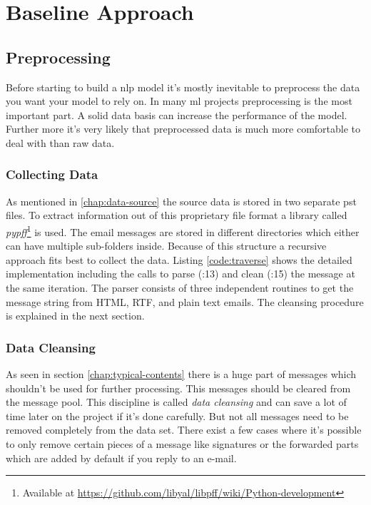 \chapter{Baseline Approach}

\section{Preprocessing}

Before starting to build a \acrshort{nlp} model it's mostly inevitable to preprocess the data you want your model to rely on. In many
\acrlong{ml} projects preprocessing is the most important part. A solid data basis can increase the performance of the model. Further
more it's very likely that preprocessed data is much more comfortable to deal with than raw data.

\subsection{Collecting Data}

As mentioned in \ref{chap:data-source} the source data is stored in two separate \acrshort{pst} files. To extract information out of this
proprietary file format a library called \emph{pypff}\footnote{Available at \url{https://github.com/libyal/libpff/wiki/Python-development}}
is used. The email messages are stored in different directories which either can have multiple sub-folders inside. Because of this structure
a recursive approach fits best to collect the data. Listing \ref{code:traverse} shows the detailed implementation including the calls to
parse (:13) and clean (:15) the message at the same iteration. The parser consists of three independent routines to get the message string
from HTML, RTF, and plain text emails. The cleansing procedure is explained in the next section.

\subsection{Data Cleansing}
\label{chap:cleansing}
As seen in section \ref{chap:typical-contents} there is a huge part of messages which shouldn't be used for further processing. This messages
should be cleared from the message pool. This discipline is called \emph{data cleansing} and can save a lot of time later on the project if
it's done carefully. But not all messages need to be removed completely from the data set. There exist a few cases where it's possible to only
remove certain pieces of a message like signatures or the forwarded parts which are added by default if you reply to an e-mail.

